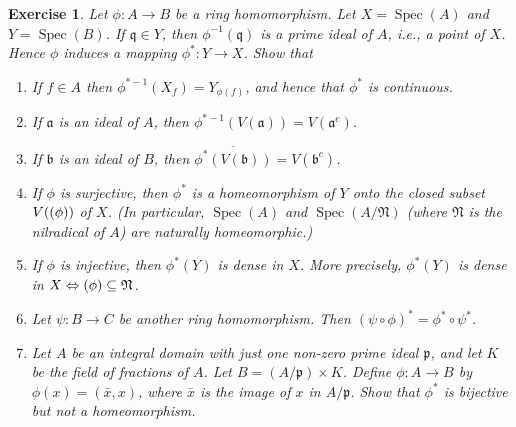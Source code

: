 \documentclass{article}
\theoremstyle{breakstyle}
\newtheorem{exercise}{Exercise}
\let\ker\relax
\DeclareMathOperator{\ker}{Ker}
\DeclareMathOperator{\spec}{Spec}
\begin{document}
\begin{exercise}
Let \(\phi:A\to B\) be a ring homomorphism. Let \(X=\spec(A)\) and \(Y=\spec(B)\). If \(\mathfrak q\in Y\), then \(\phi^{-1}(\mathfrak q)\) is a prime ideal of \(A\), i.e., a point of \(X\). Hence \(\phi\) induces a mapping \(\phi^*:Y\to X\). Show that
\begin{enumerate}[label=(\roman*)]
    \item If \(f\in A\) then \(\phi^{*-1}(X_f)=Y_{\phi(f)}\), and hence that \(\phi^*\) is continuous.
    \item If \(\mathfrak a\) is an ideal of \(A\), then \(\phi^{*-1}(V(\mathfrak a))=V(\mathfrak a^e)\).
    \item If \(\mathfrak b\) is an ideal of \(B\), then \(\overline{\phi^*(V(\mathfrak b))}=V(\mathfrak b^c)\).
    \item If \(\phi\) is surjective, then \(\phi^*\) is a homeomorphism of \(Y\) onto the closed subset \(V(\ker(\phi))\) of \(X\). (In particular, \(\spec(A)\) and \(\spec(A/\mathfrak N)\) (where \(\mathfrak N\) is the nilradical of \(A\)) are naturally homeomorphic.)
    \item If \(\phi\) is injective, then \(\phi^*(Y)\) is dense in \(X\). More precisely, \(\phi^*(Y)\) is dense in \(X\Leftrightarrow\ker(\phi)\subseteq\mathfrak N\).
    \item Let \(\psi:B\to C\) be another ring homomorphism. Then \((\psi\circ\phi)^*=\phi^*\circ\psi^*\).
    \item Let \(A\) be an integral domain with just one non-zero prime ideal \(\mathfrak p\), and let \(K\) be the field of fractions of \(A\). Let \(B=(A/\mathfrak p)\times K\). Define \(\phi:A\to B\) by \(\phi(x)=(\bar x,x)\), where \(\bar x\) is the image of \(x\) in \(A/\mathfrak p\). Show that \(\phi^*\) is bijective but not a homeomorphism.
\end{enumerate}


\end{exercise}
\end{document}
